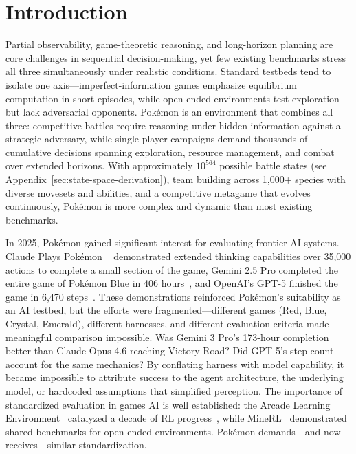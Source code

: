\section{Introduction}
\label{sec:intro}

Partial observability, game-theoretic reasoning, and long-horizon planning are core challenges in sequential decision-making, yet few existing benchmarks stress all three simultaneously under realistic conditions. Standard testbeds tend to isolate one axis---imperfect-information games emphasize equilibrium computation in short episodes, while open-ended environments test exploration but lack adversarial opponents. Pokémon is an environment that combines all three: competitive battles require reasoning under hidden information against a strategic adversary, while single-player campaigns demand thousands of cumulative decisions spanning exploration, resource management, and combat over extended horizons. With approximately $10^{564}$ possible battle states (see Appendix~\ref{sec:state-space-derivation}), team building across 1,000+ species with diverse movesets and abilities, and a competitive metagame that evolves continuously, Pokémon is more complex and dynamic than most existing benchmarks.

In 2025, Pokémon gained significant interest for evaluating frontier AI systems. Claude Plays Pokémon ~\citep{anthropic2025visible} demonstrated extended thinking capabilities over 35,000 actions to complete a small section of the game, Gemini 2.5 Pro completed the entire game of Pokémon Blue in 406 hours~\citep{gemini2p5report,zhang2025geminiplayspokemon}, and OpenAI's GPT-5 finished the game in 6,470 steps~\citep{engadget2025gptplayspokemon}.
These demonstrations reinforced Pokémon's suitability as an AI testbed, but the efforts were fragmented---different games (Red, Blue, Crystal, Emerald), different harnesses, and different evaluation criteria made meaningful comparison impossible. Was Gemini 3 Pro's 173-hour completion better than Claude Opus 4.6 reaching Victory Road? Did GPT-5's step count account for the same mechanics? By conflating harness with model capability, it became impossible to attribute success to the agent architecture, the underlying model, or hardcoded assumptions that simplified perception. The importance of standardized evaluation in games AI is well established: the Arcade Learning Environment~\citep{bellemare2013arcade} catalyzed a decade of RL progress~\citep{mnih2015human}, while MineRL~\citep{guss2019minerl, milani2023solvingfuzzytaskshuman, shah2022retrospective} demonstrated shared benchmarks for open-ended environments. Pokémon demands---and now receives---similar standardization.


